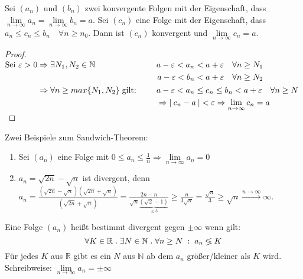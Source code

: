 \documentclass[a4paper,titlepage,oneside]{article}
\def\N{\ensuremath{\mathbb{N}} }
\def\R{\ensuremath{\mathbb{R}} }
\renewcommand{\epsilon}{\ensuremath{\varepsilon} }
\def\sp{\hspace{0,1cm}}
\def\spdot{\sp.\sp}
\def\spcolon{\sp:\sp}
\renewcommand{\liminf}[2][n]{\ensuremath{\lim\limits_{#1 \rightarrow \infty}{#2}}}
\newcommand{\abs}[1]{\ensuremath{\left|\:#1\:\right|}}
\newcommand{\longtoinf}[1][n]{\ensuremath{\overset{\scriptscriptstyle{#1 \to \infty}}{\longrightarrow}}}
\theoremstyle{thmstyle}
\begin{document}
\begin{subsatz}
Sei \((a_n)\text{ und }(b_n)\) zwei konvergente Folgen mit der Eigenschaft, dass \(\liminf{a_n} = \liminf{b_n} = a\).
Sei \((c_n)\) eine Folge mit der Eigenschaft, dass \(a_n \le c_n \le b_n \quad \forall n \ge n_0\).
Dann ist \((c_n)\) konvergent und \(\liminf{c_n} = a\).
\begin{proof}
\begin{math}
\begin{aligned}[t] \displaystyle \text{Sei }\epsilon > 0 &\Rightarrow \exists  N_1, N_2 \in \N \quad
&&\begin{aligned}[t] a - \epsilon < a_n < a + \epsilon & \quad \forall n \ge N_1 \\
			   a - \epsilon < b_n < a + \epsilon & \quad \forall n \ge N_2
\end{aligned} \\
&\Rightarrow \forall n \ge max\{N_1, N_2\} \sp \text{gilt: } \quad &&\begin{aligned}[t] &a-\epsilon < a_n \le c_n \le b_n < a + \epsilon \quad  \forall n \ge N \\
&\Rightarrow \abs{c_n - a} < \epsilon \Rightarrow \liminf{c_n} = a
\end{aligned}
\end{aligned}\\
\end{math}
\end{proof}
\end{subsatz}

\begin{subbsp}
Zwei Beispiele zum Sandwich-Theorem:
\begin{enumerate}
\item Sei \((a_n)\) eine Folge mit \(0 \le a_n \le \frac{1}{n} \Rightarrow \liminf{a_n} = 0\)
\item \(a_n = \sqrt{2n} - \sqrt{n}\) ist divergent, denn \\
$ \displaystyle a_n = \frac{\left(\sqrt{2n} - \sqrt{n}\right)\left(\sqrt{2n} + \sqrt{n}\right)}{\left(\sqrt{2n} + \sqrt{n}\right)} = \frac{2n - n}{\sqrt{n} \underbrace{\left(\sqrt{2} - 1\right)}_{\le3}} \ge \frac{n}{3\sqrt{n}} = \frac{\sqrt{n}}{3} \ge \sqrt{n} \longtoinf \infty $.
\end{enumerate}
\end{subbsp}

\begin{subdefi}
Eine Folge \((a_n)\) heißt bestimmt divergent gegen \(\pm \infty \) wenn gilt:
\[\forall K \in \R \spdot \exists N \in \N \spdot \forall n \ge N \spcolon  a_n \lessgtr K \]
Für jedes $K$ aus \R  gibt es ein $N$ aus \N ab dem $a_n$ größer/kleiner als $K$ wird. Schreibweise: \(\liminf{a_n} = \pm \infty \)
\end{subdefi}
\end{document}
